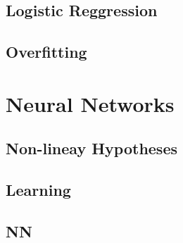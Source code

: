 \documentclass[en,11pt,english,black,simple,device=ppt]{elegantbook}
\begin{document}
\section{Logistic Reggression}



\section{Overfitting}



\chapter{Neural Networks}

\section{Non-lineay Hypotheses}



\section{Learning}



\section{NN}


\end{document}
